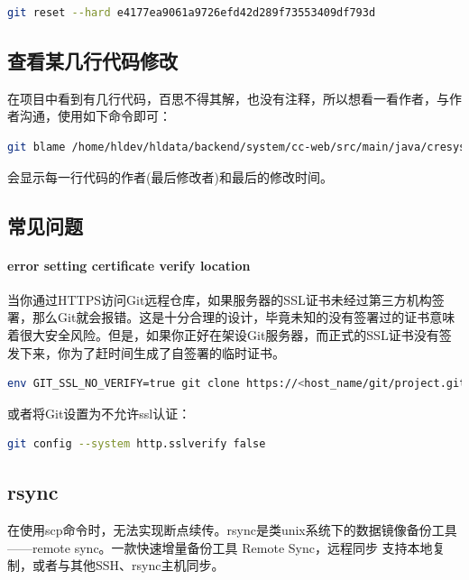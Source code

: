 \documentclass[letter]{book}
\begin{document}
\begin{lstlisting}[language=Bash]
git reset --hard e4177ea9061a9726efd42d289f73553409df793d
\end{lstlisting}



\subsection{查看某几行代码修改}在项目中看到有几行代码，百思不得其解，也没有注释，所以想看一看作者，与作者沟通，使用如下命令即可：

\begin{lstlisting}[language=Bash]
git blame /home/hldev/hldata/backend/system/cc-web/src/main/java/cresystem/web/controllers/pubapi/PubapiOrgController.java
\end{lstlisting}

会显示每一行代码的作者(最后修改者)和最后的修改时间。

\subsection{常见问题}


\paragraph{error setting certificate verify location}

当你通过HTTPS访问Git远程仓库，如果服务器的SSL证书未经过第三方机构签署，那么Git就会报错。这是十分合理的设计，毕竟未知的没有签署过的证书意味着很大安全风险。但是，如果你正好在架设Git服务器，而正式的SSL证书没有签发下来，你为了赶时间生成了自签署的临时证书。

\begin{lstlisting}[language=Bash]
env GIT_SSL_NO_VERIFY=true git clone https://<host_name/git/project.git
\end{lstlisting}

或者将Git设置为不允许ssl认证：

\begin{lstlisting}[language=Bash]
git config --system http.sslverify false
\end{lstlisting}

\subsection{rsync}

在使用scp命令时，无法实现断点续传。rsync是类unix系统下的数据镜像备份工具——remote sync。一款快速增量备份工具 Remote Sync，远程同步 支持本地复制，或者与其他SSH、rsync主机同步。
\end{document}
